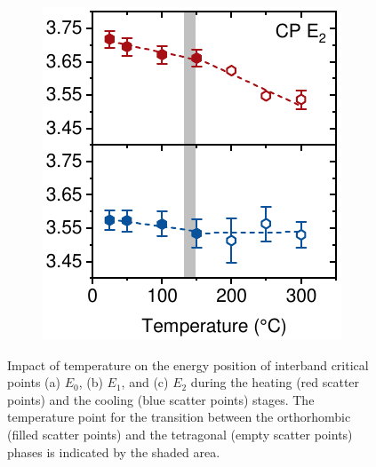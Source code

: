 \begin{figure}[htbp]
\begin{subfigure}{0.31\textwidth}
        \caption{}
        \label{fig:ellipsometry:CP1}
    \end{subfigure}
    \hfill
    \begin{subfigure}{0.31\textwidth}
        \includegraphics[width=\textwidth]{chapters/ellipsometry/image/CP3}
        \caption{}
        \label{fig:ellipsometry:deriv:CP2}
    \end{subfigure}
    \caption{Impact of temperature on the energy position of interband critical points (a) $E_0$, (b) $E_1$, and (c) $E_2$ during the heating (red scatter points) and the cooling (blue scatter points) stages. The temperature point for the transition between the orthorhombic (filled scatter points) and the tetragonal (empty scatter points) phases is indicated by the shaded area.}
    \label{fig:ellipsometry:CP_all}
\end{figure}


